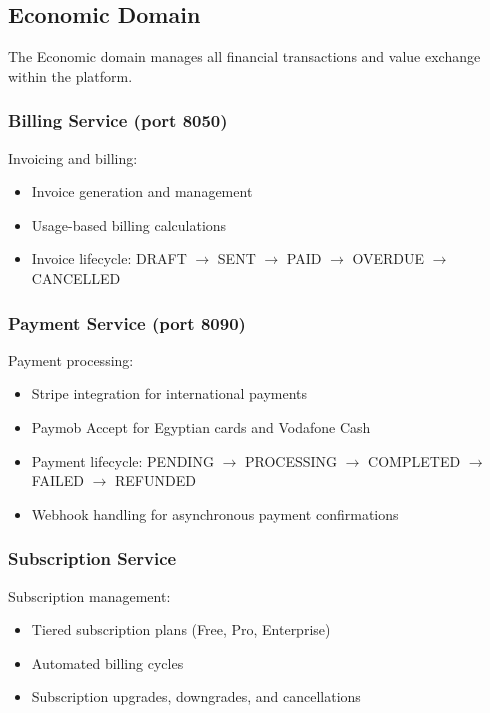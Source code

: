 \subsection{Economic Domain}

The Economic domain manages all financial transactions and value exchange within the platform.

\subsubsection{Billing Service (port 8050)}

Invoicing and billing:
\begin{itemize}
  \item Invoice generation and management
  \item Usage-based billing calculations
  \item Invoice lifecycle: DRAFT $\rightarrow$ SENT $\rightarrow$ PAID $\rightarrow$ OVERDUE $\rightarrow$ CANCELLED
\end{itemize}

\subsubsection{Payment Service (port 8090)}

Payment processing:
\begin{itemize}
  \item Stripe integration for international payments
  \item Paymob Accept for Egyptian cards and Vodafone Cash
  \item Payment lifecycle: PENDING $\rightarrow$ PROCESSING $\rightarrow$ COMPLETED $\rightarrow$ FAILED $\rightarrow$ REFUNDED
  \item Webhook handling for asynchronous payment confirmations
\end{itemize}

\subsubsection{Subscription Service}

Subscription management:
\begin{itemize}
  \item Tiered subscription plans (Free, Pro, Enterprise)
  \item Automated billing cycles
  \item Subscription upgrades, downgrades, and cancellations
\end{itemize}

